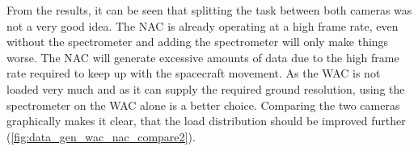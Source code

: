 \begin{table}[htb!]
  \centering
    \caption{The total data generated by the NAC with spectrometer, during a flyby}
  \label{tab:nac_flyby_data_spectrometer}%
\end{table}%

From the results, it can be seen that splitting the task between both cameras was not a very good idea. The NAC is already operating at a high frame rate, even without the spectrometer and adding the spectrometer will only make things worse. The NAC will generate excessive amounts of data due to the high frame rate required to keep up with the spacecraft movement. As the WAC is not loaded very much and as it can supply the required ground resolution, using the spectrometer on the WAC alone is a better choice. Comparing the two cameras graphically makes it clear, that the load distribution should be improved further (\ref{fig:data_gen_wac_nac_compare2}).


